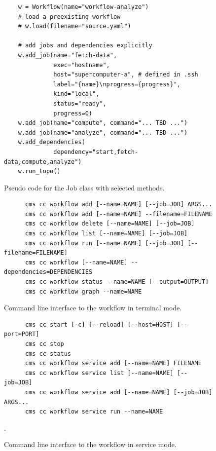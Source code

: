\documentclass[sigplan,screen]{acmart}
\begin{document}
\begin{figure}[htb]
\begin{verbatim}
    w = Workflow(name="workflow-analyze")
    # load a preexisting workflow
    # w.load(filename="source.yaml")
    
    # add jobs and dependencies explicitly
    w.add_job(name="fetch-data",
              exec="hostname",
              host="supercomputer-a", # defined in .ssh
              label="{name}\nprogress={progress}",
              kind="local",
              status="ready",
              progress=0)
    w.add_job(name="compute", command="... TBD ...")
    w.add_job(name="analyze", command="... TBD ...")
    w.add_dependencies(
              dependency="start,fetch-data,compute,analyze")
    w.run_topo()
\end{verbatim}
\caption{Pseudo code for the Job class with selected methods.}
\label{fig:code-workflow-example}

\bigskip

\begin{verbatim}
      cms cc workflow add [--name=NAME] [--job=JOB] ARGS...
      cms cc workflow add [--name=NAME] --filename=FILENAME
      cms cc workflow delete [--name=NAME] [--job=JOB]
      cms cc workflow list [--name=NAME] [--job=JOB]
      cms cc workflow run [--name=NAME] [--job=JOB] [--filename=FILENAME]
      cms cc workflow [--name=NAME] --dependencies=DEPENDENCIES
      cms cc workflow status --name=NAME [--output=OUTPUT]
      cms cc workflow graph --name=NAME
\end{verbatim}
\caption{Command line interface to the workflow in terminal mode.}
\label{fig:code-workflow-commandline}

\bigskip

\begin{verbatim}
      cms cc start [-c] [--reload] [--host=HOST] [--port=PORT]
      cms cc stop
      cms cc status
      cms cc workflow service add [--name=NAME] FILENAME
      cms cc workflow service list [--name=NAME] [--job=JOB]
      cms cc workflow service add [--name=NAME] [--job=JOB] ARGS...
      cms cc workflow service run --name=NAME
\end{verbatim}
\caption{Command line interface to the workflow in service mode.}
\label{fig:code-workflow-service-commandline}.



\end{figure}
\end{document}
